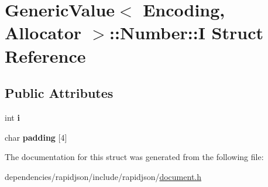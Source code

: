\hypertarget{struct_generic_value_1_1_number_1_1_i}{}\section{Generic\+Value$<$ Encoding, Allocator $>$\+:\+:Number\+:\+:I Struct Reference}
\label{struct_generic_value_1_1_number_1_1_i}
\subsection*{Public Attributes}
\begin{DoxyCompactItemize}
\item 
\mbox{\label{struct_generic_value_1_1_number_1_1_i_ae0b250dc448d284cf9019f3932bfc380}} 
int {\bfseries i}
\item 
\mbox{\label{struct_generic_value_1_1_number_1_1_i_aefc064997f30c9c0b2bdce187d1d4cce}} 
char {\bfseries padding} \mbox{[}4\mbox{]}
\end{DoxyCompactItemize}


The documentation for this struct was generated from the following file\+:\begin{DoxyCompactItemize}
\item 
dependencies/rapidjson/include/rapidjson/\hyperlink{document_8h}{document.\+h}\end{DoxyCompactItemize}
